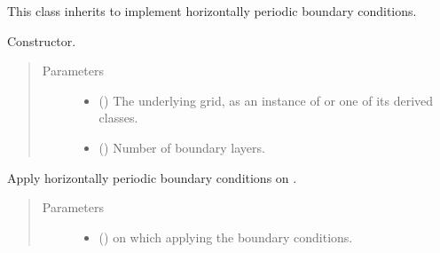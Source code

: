 \documentclass[letterpaper,10pt,english]{sphinxmanual}
\begin{document}
\begin{fulllineitems}
\label{\detokenize{api:dycore.horizontal_boundary.Periodic}}
This class inherits {\hyperref[\detokenize{api:dycore.horizontal_boundary.HorizontalBoundary}]{}} to implement horizontally periodic boundary conditions.

\begin{fulllineitems}
\label{\detokenize{api:dycore.horizontal_boundary.Periodic.__init__}}
Constructor.
\begin{quote}\begin{description}
\item[{Parameters}] \leavevmode\begin{itemize}
\item {} 
 () \textendash{} The underlying grid, as an instance of {\hyperref[\detokenize{api:grids.xyz_grid.XYZGrid}]{}} or one of
its derived classes.

\item {} 
 () \textendash{} Number of boundary layers.

\end{itemize}

\end{description}\end{quote}

\end{fulllineitems}


\begin{fulllineitems}
\label{\detokenize{api:dycore.horizontal_boundary.Periodic.apply}}
Apply horizontally periodic boundary conditions on .
\begin{quote}\begin{description}
\item[{Parameters}] \leavevmode\begin{itemize}
\item {} 
 () \textendash{}  on which applying the boundary conditions.


\end{itemize}
\end{description}
\end{quote}
\end{fulllineitems}
\end{fulllineitems}
\end{document}

